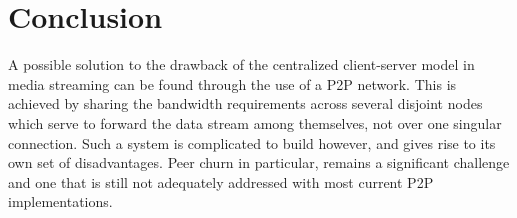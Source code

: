 \documentclass[fleqn,24pt]{SelfArx} %
\begin{document}
\section{Conclusion}

A possible solution to the drawback of the centralized client-server model in media streaming can be found through the use of a P2P network. This is achieved by sharing the bandwidth requirements across several disjoint nodes which serve to forward the data stream among themselves, not over one singular connection. Such a system is complicated to build however, and gives rise to its own set of disadvantages. Peer churn in particular, remains a significant challenge and one that is still not adequately addressed with most current P2P implementations.




\end{document}
